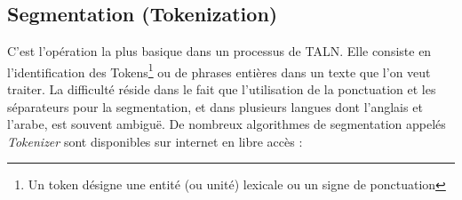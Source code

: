     \subsection{Segmentation (Tokenization)}
    C'est l'opération la plus basique dans un processus de TALN. Elle consiste en l'identification des Tokens\footnote{Un token désigne une entité (ou unité) lexicale ou un signe de ponctuation} ou de phrases entières dans un texte que l'on veut traiter. La difficulté réside dans le fait que l'utilisation de la ponctuation et les séparateurs pour la segmentation, et dans plusieurs langues dont l'anglais et l'arabe, est souvent ambiguë.     
    De nombreux algorithmes de segmentation appelés \emph{Tokenizer} sont disponibles sur internet en libre accès :

